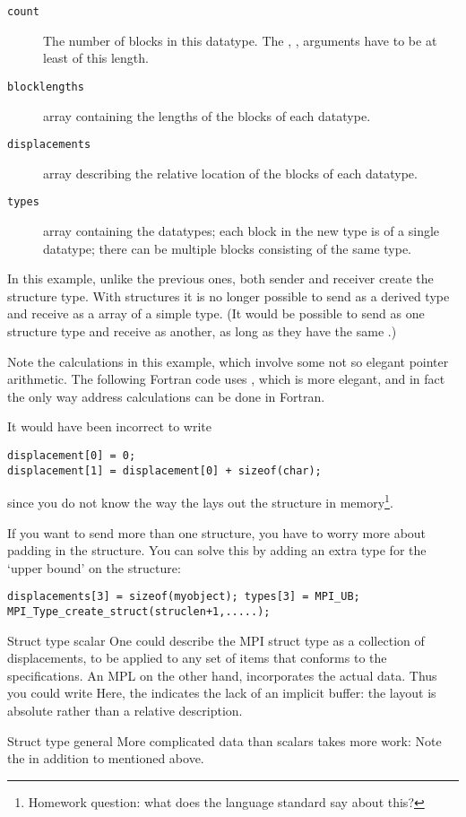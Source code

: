 \begin{description}
\item[\texttt{count}] The number of blocks in this
  datatype. The , , 
  arguments have to be at least of this length.
\item[\texttt{blocklengths}] array containing the lengths of the blocks of each datatype.
\item[\texttt{displacements}] array describing the relative location
  of the blocks of each datatype.
\item[\texttt{types}] array containing the datatypes; each block in
  the new type is of a single datatype; there can be multiple
  blocks consisting of the same type.
\end{description}
In this example, unlike the previous ones, both sender and receiver
create the structure type. With structures it is no longer possible to
send as a derived type and receive as a array of a simple type.
(It would be possible to send as one structure type and receive as another, 
as long as they have the same .)


Note the  calculations in this example,
which involve some not so elegant pointer arithmetic.
The following Fortran code uses ,
which is more elegant, and in fact
the only way address calculations can be done in Fortran.


It would have been incorrect to write
\begin{lstlisting}
displacement[0] = 0;
displacement[1] = displacement[0] + sizeof(char);
\end{lstlisting}
since you do not know the way the  lays out the
structure in memory\footnote{Homework question: what does the language
  standard say about this?}.

If you want to send more than one structure, you have to worry more
about padding in the structure. You can solve this by adding an extra
type  for the `upper bound' on the structure:
\begin{lstlisting}
displacements[3] = sizeof(myobject); types[3] = MPI_UB;
MPI_Type_create_struct(struclen+1,.....);
\end{lstlisting}

\begin{mplnote}{Struct type scalar}
  One could describe the MPI struct type as a collection of
  displacements, to be applied to any set of items that conforms
  to the specifications.
  An \ac{MPL}  on the other hand,
  incorporates the actual data. Thus you could write
  Here, the  indicates the lack of an implicit buffer:
  the layout is absolute rather than a relative description.
\end{mplnote}

\begin{mplnote}{Struct type general}
  More complicated data than scalars takes more work:
  Note the  in addition to
   mentioned above.
\end{mplnote}
